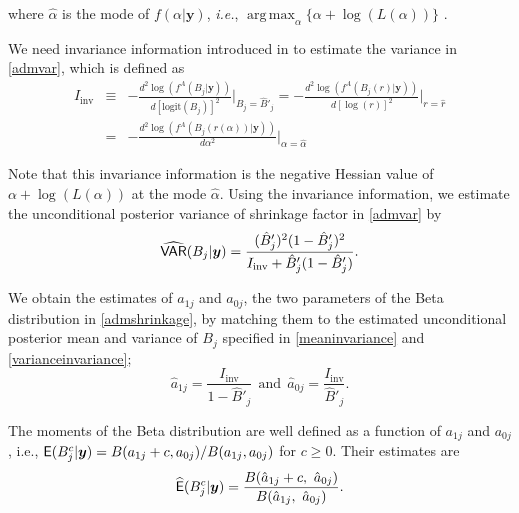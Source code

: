 \documentclass[article]{jss}
\DeclareMathOperator*{\argmax}{arg\,max}
\begin{document}
where $\hat{\alpha}$ is the mode of $f(\alpha\vert\boldsymbol{y})$, \emph{i.e.}, $\argmax_{\alpha}\{\alpha+\log(L(\alpha))\}$ .

We need  invariance information introduced in \cite{tang2011} to estimate the variance in  \eqref{admvar}, which is defined as 
\begin{eqnarray}
I_\textrm{inv} &\equiv& -\frac{d^2 \log(f^A(B_j\vert \boldsymbol{y}))}{d[\textrm{logit}(B_j)]^2}\bigg\vert_{B_j=\hat{B}'_j}=-\frac{d^2 \log(f^A(B_j(r)\vert \boldsymbol{y}))}{d[\log(r)]^2}\bigg\vert_{r=\hat{r}}\label{invariance}\\
&=& -\frac{d^2 \log(f^A(B_j(r(\alpha))\vert \boldsymbol{y}))}{d\alpha^2}\bigg\vert_{\alpha=\hat{\alpha}}\nonumber
\end{eqnarray}

Note that this invariance information is  the negative Hessian value of $\alpha+\log(L(\alpha))$ at the mode $\hat{\alpha}$. Using the invariance information, we  estimate the unconditional posterior variance of shrinkage factor in  \eqref{admvar} by
\begin{equation}\label{varianceinvariance}
\widehat{\mathsf{VAR}}(B_j\vert\boldsymbol{y})=\frac{(\hat{B}'_j)^2(1-\hat{B}'_j)^2}{I_\textrm{inv} +\hat{B}'_j(1-\hat{B}'_j)}.
\end{equation}

We obtain the estimates of $a_{1j}$ and $a_{0j}$, the two parameters of the Beta distribution in  \eqref{admshrinkage}, by matching them to the estimated unconditional posterior mean and variance of $B_j$ specified in  \eqref{meaninvariance} and \eqref{varianceinvariance};
\begin{equation}\label{admpara}
\hat{a}_{1j}=\frac{I_\textrm{inv}}{1-\hat{B}'_j}~~\textrm{and}~~\hat{a}_{0j}=\frac{I_\textrm{inv}}{\hat{B}'_j}.
\end{equation}

The moments of the Beta distribution are well defined as a function of $a_{1j}$ and $a_{0j}$, i.e.,  $\mathsf{E}(B^c_j\vert\boldsymbol{y})=B(a_{1j} + c, a_{0j})/B(a_{1j}, a_{0j})$ for $c\ge0$. Their estimates are 
\begin{equation}\label{shrinkagemoments}
\widehat{\mathsf{E}}(B^c_j\vert\boldsymbol{y})= \frac{B(\hat{a}_{1j} + c,~ \hat{a}_{0j})}{B(\hat{a}_{1j},~ \hat{a}_{0j})}.
\end{equation}
\end{document}
